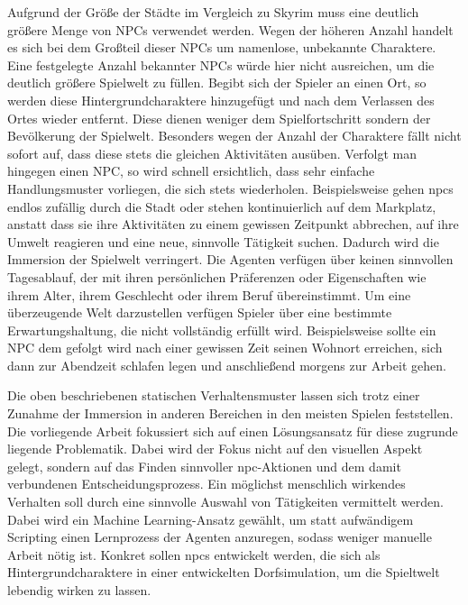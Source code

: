 Aufgrund der Größe der Städte im Vergleich zu Skyrim muss eine deutlich größere Menge von NPCs verwendet werden. Wegen der höheren Anzahl handelt es sich bei dem Großteil dieser NPCs um namenlose, unbekannte Charaktere. Eine festgelegte Anzahl bekannter NPCs würde hier nicht ausreichen, um die deutlich größere Spielwelt zu füllen. Begibt sich der Spieler an einen Ort, so werden diese Hintergrundcharaktere hinzugefügt und nach dem Verlassen des Ortes wieder entfernt. Diese dienen weniger dem Spielfortschritt sondern der Bevölkerung der Spielwelt. Besonders wegen der Anzahl der Charaktere fällt nicht sofort auf, dass diese stets die gleichen Aktivitäten ausüben. Verfolgt man hingegen einen NPC, so wird schnell ersichtlich, dass sehr einfache Handlungsmuster vorliegen, die sich stets wiederholen. Beispielsweise gehen \acp{npc} endlos zufällig durch die Stadt oder stehen kontinuierlich auf dem Markplatz, anstatt dass sie ihre Aktivitäten zu einem gewissen Zeitpunkt abbrechen, auf ihre Umwelt reagieren und eine neue, sinnvolle Tätigkeit suchen. Dadurch wird die Immersion der Spielwelt verringert. Die Agenten verfügen über keinen sinnvollen Tagesablauf, der mit ihren persönlichen Präferenzen oder Eigenschaften wie ihrem Alter, ihrem Geschlecht oder ihrem Beruf übereinstimmt. Um eine überzeugende Welt darzustellen verfügen Spieler über eine bestimmte Erwartungshaltung, die nicht vollständig erfüllt wird. Beispielsweise sollte ein NPC dem gefolgt wird nach einer gewissen Zeit seinen Wohnort erreichen, sich dann zur Abendzeit schlafen legen und anschließend morgens zur Arbeit gehen.

Die oben beschriebenen statischen Verhaltensmuster lassen sich trotz einer Zunahme der Immersion in anderen Bereichen in den meisten Spielen feststellen. Die vorliegende Arbeit fokussiert sich auf einen Lösungsansatz für diese zugrunde liegende Problematik. Dabei wird der Fokus nicht auf den visuellen Aspekt gelegt, sondern auf das Finden sinnvoller \ac{npc}-Aktionen und dem damit verbundenen Entscheidungsprozess. Ein möglichst menschlich wirkendes Verhalten soll durch eine sinnvolle Auswahl von Tätigkeiten vermittelt werden. Dabei wird ein Machine Learning-Ansatz gewählt, um statt aufwändigem Scripting einen Lernprozess der Agenten anzuregen, sodass weniger manuelle Arbeit nötig ist. Konkret sollen \acp{npc} entwickelt werden, die sich als Hintergrundcharaktere in einer entwickelten Dorfsimulation, um die Spieltwelt lebendig wirken zu lassen.

